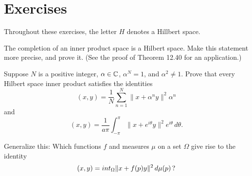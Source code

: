 
\section{Exercises} %

Throughout these exercises, the letter $H$ denotes a Hillbert space.

\begin{enumerate}

\begin{excopy}
The completion of an inner product space is a Hilbert space.
Make this statement more precise, and prove it.
(See the proof of Theorem 12.40 for an application.)
\end{excopy}

\begin{excopy}
Suppose $N$ is a positive integer,
\(\alpha \in \mathbb{C}\), \(\alpha^N = 1\), and \(\alpha^2 \neq 1\).
Prove that every
Hilbert space inner product satisfies the identities
\begin{equation*}
 (x, y) = \frac{1}{N}\sum_{n=1}^N \|x + \alpha^n y\|^2 \alpha^n
\end{equation*}
and
\begin{equation*}
 (x, y) = \frac{1}{a\pi}\int_{-\pi}^\pi \|x + e^{i\theta} y\|^2 e^{i\theta}\,d\theta.
\end{equation*}

Generalize this: Which functions $f$ and
measures \(\mu\) on a set \(\Omega\) give rise to the
identity
\begin{equation*}
 (x, y) = int_\Omega \|x + f(p)y\|^2 \,d\mu(p) \,\textnormal{?}
\end{equation*}

\end{excopy}


\unfinished

\end{enumerate}


